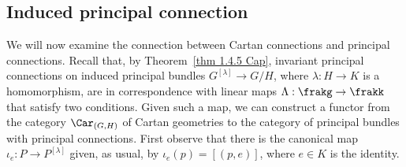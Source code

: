 \subsection{Induced principal connection}



We will now examine the connection between Cartan connections and principal connections. Recall that, by Theorem~\ref{thm 1.4.5 Cap}, invariant principal connections on induced principal bundles $G^{[\lambda]}\to G\slash H$, where $\lambda:H\to K$ is a homomorphism, are in correspondence with linear maps $\Lambda:\frakg\to\frakk$ that satisfy two conditions. Given such a map, we can construct a functor from the category $\Car_{(G,H)}$ of Cartan geometries to the category of principal bundles with principal connections. First observe that there is the canonical map $\iota_e:P\to P^{[\lambda]}$ given, as usual, by $\iota_e(p)=[(p,e)]$, where $e\in K$ is the identity. 



